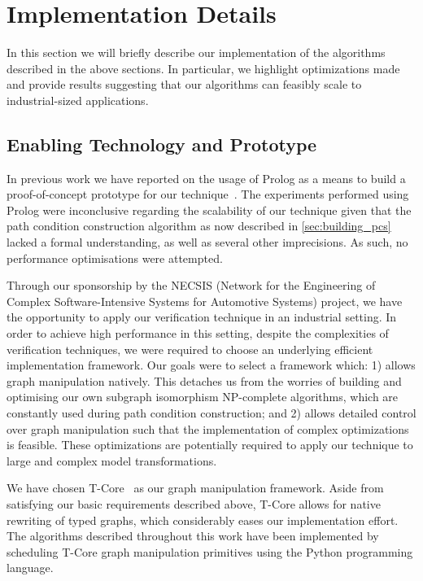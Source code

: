 \section{Implementation Details}
\label{sec:implementation}

In this section we will briefly describe our implementation of the algorithms described in the above sections. In particular, we highlight optimizations made and provide results suggesting that our algorithms can feasibly scale to industrial-sized applications.

\subsection{Enabling Technology and Prototype}

In previous work we have reported on the usage of Prolog as a means to build a
proof-of-concept prototype for our technique~\cite{Lucio:10}. The experiments
performed using Prolog were inconclusive regarding the scalability of our
technique given that the path condition construction algorithm as now described in \cref{sec:building_pcs} lacked a formal understanding, as well as several other
imprecisions. As such, no performance optimisations were attempted.

Through our sponsorship by the NECSIS (Network for the Engineering of Complex
Software-Intensive Systems for Automotive Systems) project, we have the
opportunity to apply our verification technique in an industrial setting. In
order to achieve high performance in this setting, despite the complexities of
verification techniques, we were required to choose an underlying efficient
implementation framework. Our goals were to select a framework which: 1) allows
graph manipulation natively. This detaches us from the worries of building and
optimising our own subgraph isomorphism NP-complete algorithms, which are
constantly used during path condition construction; and 2) allows detailed control over
graph manipulation such that the implementation of complex optimizations is feasible. These optimizations are potentially required to apply our technique to large and complex model transformations.

We have chosen T-Core~\cite{DBLP:journals/eceasst/SyrianiV10,SyrianiVanghel:13}
as our graph manipulation framework.
Aside from satisfying our basic requirements described above, T-Core allows
for native rewriting of typed graphs, which considerably eases our implementation
effort. The algorithms described throughout this work have been implemented by scheduling T-Core
graph manipulation primitives using the Python programming language. 

